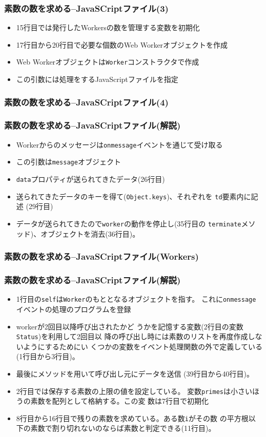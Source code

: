 \begin{frame}
 \frametitle{素数の数を求める--JavaSCriptファイル(3)}
\begin{itemize}
 \item 15行目では発行したWorkersの数を管理する変数を初期化
 \item 17行目から20行目で必要な個数のWeb Workerオブジェクトを作成
 \item Web Workerオブジェクトは\Verb+Worker+コンストラクタで作成
 \item この引数には処理をするJavaScriptファイルを指定
\end{itemize}
\end{frame}
\begin{frame}
\frametitle{素数の数を求める--JavaSCriptファイル(4)}
\end{frame}
\begin{frame}[containsverbatim]
 \frametitle{素数の数を求める--JavaSCriptファイル(解説)}
\begin{itemize}
 \item Workerからのメッセージは\Verb+onmessage+イベントを通じて受け取る
 \item この引数は\Verb+message+オブジェクト
 \item \Verb+data+プロパティが送られてきたデータ(26行目)
 \item 送られてきたデータのキーを得て(\texttt{Object.keys})、それぞれを
       \texttt{td}要素内に記述 (29行目)
 \item データが送られてきたので\Verb+worker+の動作を停止し(35行目の
        \Verb+terminate+メソッド)、オブジェクトを消去(36行目)。
\end{itemize}
\end{frame}
\begin{frame}[containsverbatim]
 \frametitle{素数の数を求める--JavaSCriptファイル(Workers)}
\end{frame}
 \begin{frame}[containsverbatim]
 \frametitle{素数の数を求める--JavaSCriptファイル(解説)}
 \begin{itemize}
  \item 1行目の\Verb+self+は\Verb+Worker+のもととなるオブジェクトを指す。
        これに\Verb+onmessage+イベントの処理のプログラムを登録
  \item workerが2回目以降呼び出されたかど
				うかを記憶する変数(2行目の変数\texttt{Status})を利用して2回目以
				降の呼び出し時には素数のリストを再度作成しないようにするためにい
				くつかの変数をイベント処理関数の外で定義している(1行目から3行目)。
  \item 最後にメソッドを用いて呼び出し元にデータを送信
        (39行目から40行目)。
  \item 2行目では保存する素数の上限の値を設定している。
        変数\Verb+primes+は小さいほうの素数を配列として格納する。この変
        数は7行目で初期化
  \item 8行目から16行目で残りの素数を求めている。ある数\Verb+i+がその数
        の平方根以下の素数で割り切れないのならば素数と判定できる(11行目)。
 \end{itemize}
 \end{frame}
